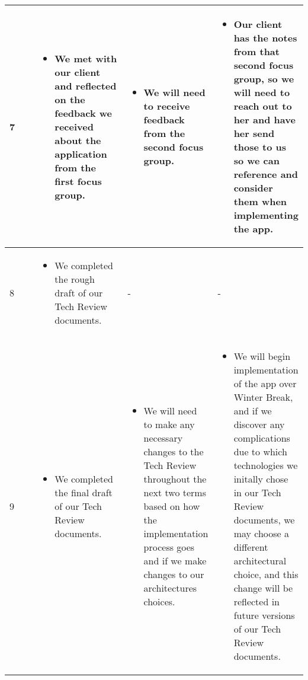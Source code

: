 \documentclass[draftclsnofoot, onecolumn, 10pt, compsoc]{IEEEtran}
\begin{document}
\begin{longtable}{|p{0.1\linewidth}|p{0.3\linewidth}|p{0.3\linewidth}|p{0.3\linewidth}|}
         7
         &
         \begin{itemize}
            \item We met with our client and reflected on the feedback we received about the application from the first focus group.
         \end{itemize}
         &
         \begin{itemize}
            \item We will need to receive feedback from the second focus group.
         \end{itemize}
         &
         \begin{itemize}
            \item Our client has the notes from that second focus group, so we will need to reach out to her and have her send those to us so we can reference and consider them when implementing the app.
         \end{itemize} \\ \hline

         8
         &
         \begin{itemize}
            \item We completed the rough draft of our Tech Review documents.
         \end{itemize}
         & -
         & - \\ \hline

         9
         &
         \begin{itemize}
            \item We completed the final draft of our Tech Review documents.
         \end{itemize}
         &
         \begin{itemize}
            \item We will need to make any necessary changes to the Tech Review throughout the next two terms based on how the implementation process goes and if we make changes to our architectures choices.
         \end{itemize}
         &
         \begin{itemize}
            \item We will begin implementation of the app over Winter Break, and if we discover any complications due to which technologies we initally chose in our Tech Review documents, we may choose a different architectural choice, and this change will be reflected in future versions of our Tech Review documents.
         \end{itemize} \\ \hline


\end{longtable}
\end{document}
